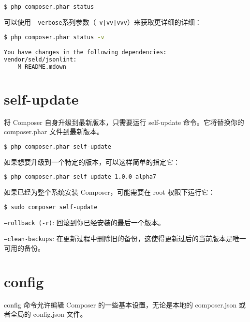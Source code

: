 \begin{lstlisting}[language=bash]
$ php composer.phar status
\end{lstlisting}

可以使用\texttt{-\/-verbose}系列参数（\texttt{-v|vv|vvv}）来获取更详细的详细：

\begin{lstlisting}[language=bash]
$ php composer.phar status -v

You have changes in the following dependencies:
vendor/seld/jsonlint:
    M README.mdown
\end{lstlisting}

\section{self-update}

将 Composer 自身升级到最新版本，只需要运行 self-update 命令。它将替换你的 composer.phar 文件到最新版本。

\begin{lstlisting}[language=bash]
$ php composer.phar self-update
\end{lstlisting}


如果想要升级到一个特定的版本，可以这样简单的指定它：

\begin{lstlisting}[language=bash]
$ php composer.phar self-update 1.0.0-alpha7
\end{lstlisting}

如果已经为整个系统安装 Composer，可能需要在 root 权限下运行它：

\begin{lstlisting}[language=bash]
$ sudo composer self-update
\end{lstlisting}

\begin{compactitem}
\item \texttt{--rollback (-r)}: 回滚到你已经安装的最后一个版本。
\item \texttt{--clean-backups}: 在更新过程中删除旧的备份，这使得更新过后的当前版本是唯一可用的备份。
\end{compactitem}

\section{config}

config 命令允许编辑 Composer 的一些基本设置，无论是本地的 composer.json 或者全局的 config.json 文件。

